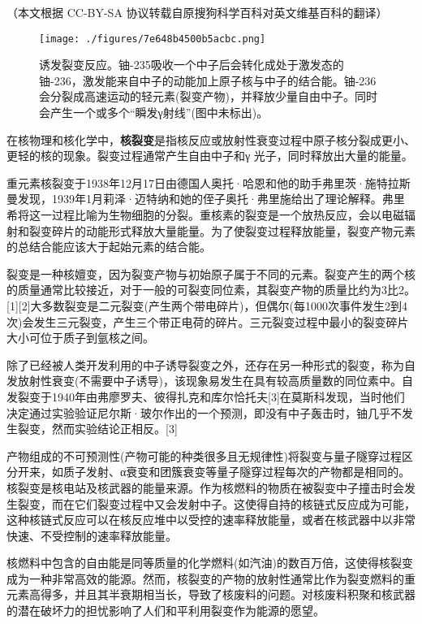 
（本文根据 CC-BY-SA 协议转载自原搜狗科学百科对英文维基百科的翻译）

\begin{figure}[ht]
\centering
\texttt{[image: ./figures/7e648b4500b5acbc.png]}
\caption{诱发裂变反应。铀-235吸收一个中子后会转化成处于激发态的铀-236，激发能来自中子的动能加上原子核与中子的结合能。铀-236会分裂成高速运动的轻元素(裂变产物)，并释放少量自由中子。同时会产生一个或多个“瞬发γ射线”(图中未标出)。} \label{fig_HLB_12}
\end{figure}

在核物理和核化学中，\textbf{核裂变}是指核反应或放射性衰变过程中原子核分裂成更小、更轻的核的现象。裂变过程通常产生自由中子和γ 光子，同时释放出大量的能量。

重元素核裂变于1938年12月17日由德国人奥托·哈恩和他的助手弗里茨·施特拉斯曼发现，1939年1月莉泽·迈特纳和她的侄子奥托·弗里施给出了理论解释。弗里希将这一过程比喻为生物细胞的分裂。重核素的裂变是一个放热反应，会以电磁辐射和裂变碎片的动能形式释放大量能量。为了使裂变过程释放能量，裂变产物元素的总结合能应该大于起始元素的结合能。

裂变是一种核嬗变，因为裂变产物与初始原子属于不同的元素。裂变产生的两个核的质量通常比较接近，对于一般的可裂变同位素，其裂变产物的质量比约为3比2。[1][2]大多数裂变是二元裂变(产生两个带电碎片)，但偶尔(每1000次事件发生2到4次)会发生三元裂变，产生三个带正电荷的碎片。三元裂变过程中最小的裂变碎片大小可位于质子到氩核之间。

除了已经被人类开发利用的中子诱导裂变之外，还存在另一种形式的裂变，称为自发放射性衰变(不需要中子诱导)，该现象易发生在具有较高质量数的同位素中。自发裂变于1940年由弗廖罗夫、彼得扎克和库尔恰托夫[3]在莫斯科发现，当时他们决定通过实验验证尼尔斯·玻尔作出的一个预测，即没有中子轰击时，铀几乎不发生裂变，然而实验结论正相反。[3]

产物组成的不可预测性(产物可能的种类很多且无规律性)将裂变与量子隧穿过程区分开来，如质子发射、α衰变和团簇衰变等量子隧穿过程每次的产物都是相同的。核裂变是核电站及核武器的能量来源。作为核燃料的物质在被裂变中子撞击时会发生裂变，而在它们裂变过程中又会发射中子。这使得自持的核链式反应成为可能，这种核链式反应可以在核反应堆中以受控的速率释放能量，或者在核武器中以非常快速、不受控制的速率释放能量。

核燃料中包含的自由能是同等质量的化学燃料(如汽油)的数百万倍，这使得核裂变成为一种非常高效的能源。然而，核裂变的产物的放射性通常比作为裂变燃料的重元素高得多，并且其半衰期相当长，导致了核废料的问题。对核废料积聚和核武器的潜在破坏力的担忧影响了人们和平利用裂变作为能源的愿望。

